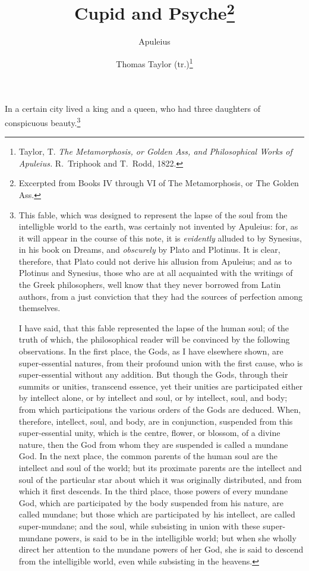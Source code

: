 \documentclass[12pt]{article}
\title{Cupid and Psyche\footnote{Excerpted from Books IV through VI of The
Metamorphosis, or The Golden Ass.}}
\author{Apuleius \and Thomas Taylor (tr.)\footnote{Taylor, T. \textit{The
Metamorphosis, or Golden Ass, and Philosophical Works of Apuleius.} R.~Triphook
and T.~Rodd, 1822.}}
\date{}
\begin{document}
\maketitle

\noindent In a certain city lived a king and a queen, who had three daughters
of conspicuous beauty.\footnote{This fable, which was designed to represent the
lapse of the soul from the intelligble world to the earth, was certainly not
invented by Apuleius: for, as it will appear in the course of this note, it is
\textit{evidently} alluded to by Synesius, in his book on Dreams, and
\textit{obscurely} by Plato and Plotinus. It is clear, therefore, that Plato
could not derive his allusion from Apuleius; and as to Plotinus and Synesius,
those who are at all acquainted with the writings of the Greek philosophers,
well know that they never borrowed from Latin authors, from a just conviction
that they had the sources of perfection among themselves.

I have said, that this fable represented the lapse of the human soul; of the
truth of which, the philosophical reader will be convinced by the following
observations. In the first place, the Gods, as I have elsewhere shown, are
super-essential natures, from their profound union with the first cause, who is
super-essential without any addition. But though the Gods, through their
summits or unities, transcend essence, yet their unities are participated
either by intellect alone, or by intellect and soul, or by intellect, soul, and
body; from which participations the various orders of the Gods are deduced.
When, therefore, intellect, soul, and body, are in conjunction, suspended from
this super-essential unity, which is the centre, flower, or blossom, of a
divine nature, then the God from whom they are suspended is called a mundane
God. In the next place, the common parents of the human soul are the intellect
and soul of the world; but its proximate parents are the intellect and soul of
the particular star about which it was originally distributed, and from which
it first descends. In the third place, those powers of every mundane God, which
are participated by the body suspended from his nature, are called mundane; but
those which are participated by his intellect, are called super-mundane; and
the soul, while subsisting in union with these super-mundane powers, is said to
be in the intelligible world; but when she wholly direct her attention to the
mundane powers of her God, she is said to descend from the intelligible world,
even while subsisting in the heavens.

}
\end{document}

